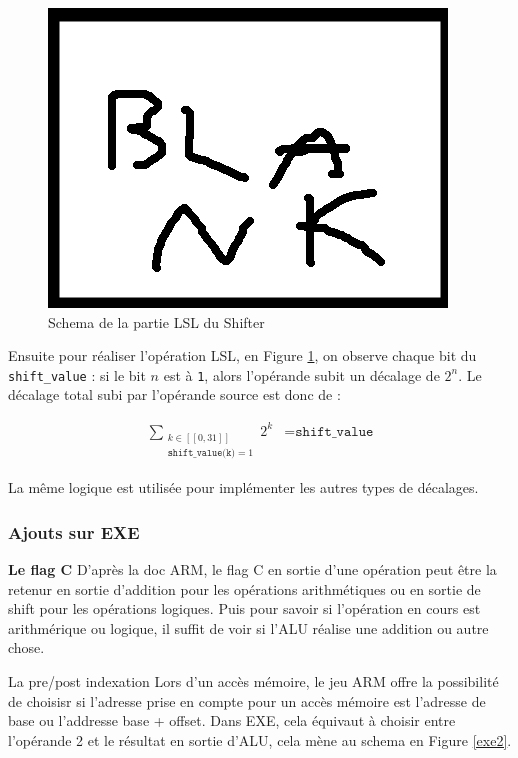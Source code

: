 \documentclass{article}
\begin{document}
\begin{figure}[ht]
\includegraphics[scale=1]{pics/blank.png}
\centering
\caption{Schema de la partie LSL du Shifter}
\label{shifter_lsl}
\end{figure}

Ensuite pour réaliser l'opération LSL, en Figure \ref{shifter_lsl},
on observe chaque bit du \texttt{shift\_value} :
si le bit $n$ est à \texttt{1}, alors l'opérande subit un décalage de $2^n$.
Le décalage total subi par l'opérande source est donc de :

\begin{eqnarray*}
  \sum_{\substack{k \in [[0, 31]] \\ \texttt{shift\_value(k)} = 1}} 2^k &= \texttt{shift\_value}
\end{eqnarray*}

La même logique est utilisée pour implémenter les autres types de décalages.

\subsubsection{Ajouts sur EXE}

\textbf{Le flag C}
D'après la doc ARM, le flag C en sortie d'une opération peut être la retenur en sortie d'addition
pour les opérations arithmétiques ou en sortie de shift pour les opérations logiques.
Puis pour savoir si l'opération en cours est arithmérique ou logique, il suffit de voir si
l'ALU réalise une addition ou autre chose.

La pre/post indexation
Lors d'un accès mémoire, le jeu ARM offre la possibilité de choisisr si l'adresse prise en compte
pour un accès mémoire est l'adresse de base ou l'addresse base + offset.
Dans EXE, cela équivaut à choisir entre l'opérande 2 et le résultat en sortie d'ALU,
cela mène au schema en Figure \ref{exe2}.
\end{document}
